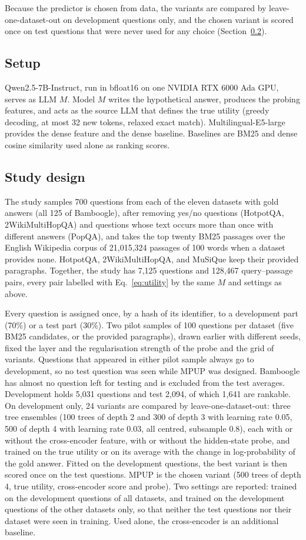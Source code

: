 \documentclass[preprint,12pt,authoryear]{elsarticle}
\begin{document}
Because the predictor is chosen from data, the variants are compared by leave-one-dataset-out on development questions only, and the chosen variant is scored once on test questions that were never used for any choice (Section~\ref{sec:big}).

\subsection{Setup}
Qwen2.5-7B-Instruct, run in bfloat16 on one NVIDIA RTX 6000 Ada GPU, serves as LLM $M$. Model $M$ writes the hypothetical answer, produces the probing features, and acts as the source LLM that defines the true utility (greedy decoding, at most 32 new tokens, relaxed exact match). Multilingual-E5-large provides the dense feature and the dense baseline. Baselines are BM25 and dense cosine similarity used alone as ranking scores.

\subsection{Study design}\label{sec:big}
The study samples 700 questions from each of the eleven datasets with gold answers (all 125 of Bamboogle), after removing yes/no questions (HotpotQA, 2WikiMultiHopQA) and questions whose text occurs more than once with different answers (PopQA), and takes the top twenty BM25 passages over the English Wikipedia corpus of 21,015,324 passages of 100 words \citep{karpukhin2020} when a dataset provides none. HotpotQA, 2WikiMultiHopQA, and MuSiQue keep their provided paragraphs. Together, the study has 7,125 questions and 128,467 query--passage pairs, every pair labelled with Eq.~\eqref{eq:utility} by the same $M$ and settings as above.

Every question is assigned once, by a hash of its identifier, to a development part (70\%) or a test part (30\%). Two pilot samples of 100 questions per dataset (five BM25 candidates, or the provided paragraphs), drawn earlier with different seeds, fixed the layer and the regularisation strength of the probe and the grid of variants. Questions that appeared in either pilot sample always go to development, so no test question was seen while MPUP was designed. Bamboogle has almost no question left for testing and is excluded from the test averages. Development holds 5,031 questions and test 2,094, of which 1,641 are rankable. On development only, 24 variants are compared by leave-one-dataset-out: three tree ensembles (100 trees of depth 2 and 300 of depth 3 with learning rate 0.05, 500 of depth 4 with learning rate 0.03, all centred, subsample 0.8), each with or without the cross-encoder feature, with or without the hidden-state probe, and trained on the true utility or on its average with the change in log-probability of the gold answer. Fitted on the development questions, the best variant is then scored once on the test questions. MPUP is the chosen variant (500 trees of depth 4, true utility, cross-encoder score and probe). Two settings are reported: trained on the development questions of all datasets, and trained on the development questions of the other datasets only, so that neither the test questions nor their dataset were seen in training. Used alone, the cross-encoder is an additional baseline.
\end{document}
